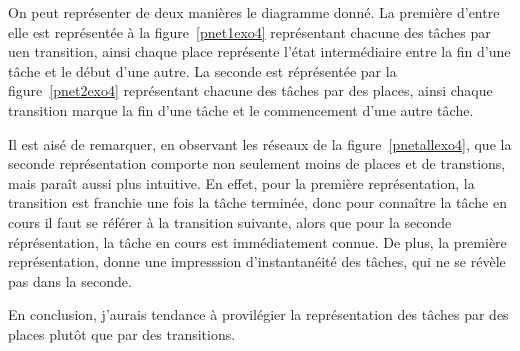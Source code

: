 On peut représenter de deux manières le diagramme donné. La première d'entre elle est représentée à
la figure~\ref{pnet1exo4} représentant chacune des tâches par uen transition, ainsi chaque place
représente l'état intermédiaire entre la fin d'une tâche et le début d'une autre. La seconde est
réprésentée par la figure~\ref{pnet2exo4} représentant chacune des tâches par des places, ainsi
chaque transition marque la fin d'une tâche et le commencement d'une autre tâche.

Il est aisé de remarquer, en observant les réseaux de la figure~\ref{pnetallexo4}, que la seconde
représentation comporte non seulement moins de places et de transtions, mais paraît aussi plus
intuitive. En effet, pour la première représentation, la transition est franchie une fois la tâche
terminée, donc pour connaître la tâche en cours il faut se référer à la transition suivante, alors
que pour la seconde réprésentation, la tâche en cours est immédiatement connue. De plus, la première
représentation, donne une impresssion d'instantanéité des tâches, qui ne se révèle pas dans la
seconde. 

En conclusion, j'aurais tendance à provilégier la représentation des tâches par des places plutôt
que par des transitions.

